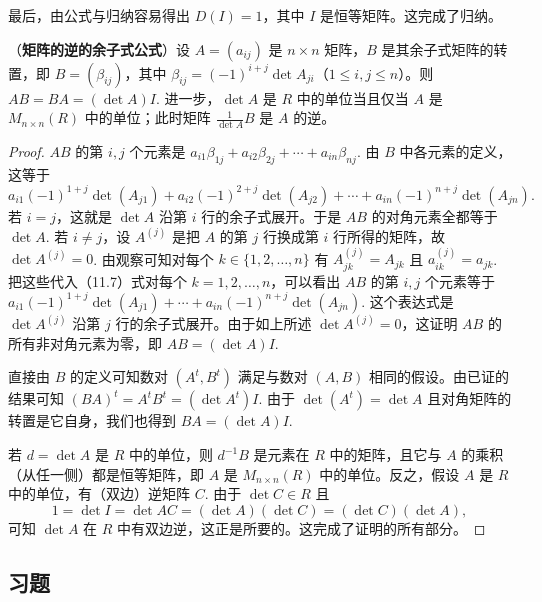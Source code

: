 最后，由公式与归纳容易得出 \(D(I) = 1\)，其中 \(I\) 是恒等矩阵。这完成了归纳。

\begin{theorem}\label{thm:11.30}
（\textbf{矩阵的逆的余子式公式}）设 \(A = (a_{ij})\) 是 \(n \times n\) 矩阵，\(B\) 是其余子式矩阵的转置，即 \(B = (\beta_{ij})\)，其中 \(\beta_{ij} = (-1)^{i+j}\det A_{ji}\)（\(1 \leq i, j \leq n\)）。则 \(AB = BA = (\det A)I\). 进一步，\(\det A\) 是 \(R\) 中的单位当且仅当 \(A\) 是 \(M_{n \times n}(R)\) 中的单位；此时矩阵 \(\frac{1}{\det A}B\) 是 \(A\) 的逆。
\end{theorem}

\begin{proof}
\(AB\) 的第 \(i, j\) 个元素是 \(a_{i1}\beta_{1j}+a_{i2}\beta_{2j}+\cdots+a_{in}\beta_{nj}\). 由 \(B\) 中各元素的定义，这等于
\begin{equation}
a_{i1}(-1)^{1+j}\det(A_{j1})+a_{i2}(-1)^{2+j}\det(A_{j2})+\cdots+a_{in}(-1)^{n+j}\det(A_{jn}). \tag{11.7}
\end{equation}
若 \(i = j\)，这就是 \(\det A\) 沿第 \(i\) 行的余子式展开。于是 \(AB\) 的对角元素全都等于 \(\det A\). 若 \(i \neq j\)，设 \(A^{(j)}\) 是把 \(A\) 的第 \(j\) 行换成第 \(i\) 行所得的矩阵，故 \(\det A^{(j)} = 0\). 由观察可知对每个 \(k \in \{1, 2, \ldots, n\}\) 有 \(A^{(j)}_{jk} = A_{jk}\) 且 \(a^{(j)}_{ik} = a_{jk}\). 把这些代入（11.7）式对每个 \(k = 1, 2, \ldots, n\)，可以看出 \(AB\) 的第 \(i, j\) 个元素等于 \(a_{i1}(-1)^{1+j}\det(A_{j1})+\cdots+a_{in}(-1)^{n+j}\det(A_{jn})\). 这个表达式是 \(\det A^{(j)}\) 沿第 \(j\) 行的余子式展开。由于如上所述 \(\det A^{(j)} = 0\)，这证明 \(AB\) 的所有非对角元素为零，即 \(AB = (\det A)I\).

直接由 \(B\) 的定义可知数对 \((A^t, B^t)\) 满足与数对 \((A, B)\) 相同的假设。由已证的结果可知 \((BA)^t = A^tB^t = (\det A^t)I\). 由于 \(\det(A^t) = \det A\) 且对角矩阵的转置是它自身，我们也得到 \(BA = (\det A)I\).

若 \(d = \det A\) 是 \(R\) 中的单位，则 \(d^{-1}B\) 是元素在 \(R\) 中的矩阵，且它与 \(A\) 的乘积（从任一侧）都是恒等矩阵，即 \(A\) 是 \(M_{n \times n}(R)\) 中的单位。反之，假设 \(A\) 是 \(R\) 中的单位，有（双边）逆矩阵 \(C\). 由于 \(\det C \in R\) 且
\[
1 = \det I = \det AC = (\det A)(\det C) = (\det C)(\det A),
\]
可知 \(\det A\) 在 \(R\) 中有双边逆，这正是所要的。这完成了证明的所有部分。
\end{proof}

\subsection*{习题}

